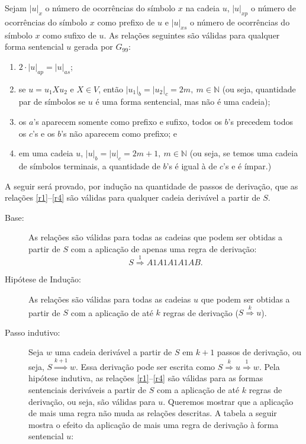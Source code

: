 \documentclass[12pt]{article}
\def\myling{{4}} %
\newcommand{\deriv}[1]{\stackrel{\scriptscriptstyle #1}{\Longrightarrow}}
\begin{document}
\begin{tcolorbox}[breakable,rounded corners, colback=yellow!5, colframe=red!40!black, title={$\mathcal{L}(G_{99})\subseteq \mathcal{L}_{\myling}$, ou seja, se $S \deriv{*} w$, então $w = a^nb^{2m+1}c^{2m+1}a^{2n},\ n,m \geqslant 0$.}]
Sejam $|u|_x$ o número de ocorrências do símbolo $x$ na cadeia $u$, $|u|_{xp}$ o número de ocorrências do símbolo $x$ como prefixo de $u$ e $|u|_{xs}$ o número de ocorrências do símbolo $x$ como sufixo de $u$.
 As relações seguintes são válidas para qualquer forma sentencial $u$ gerada por $G_{99}$:
\begin{enumerate}[label=(\roman*),ref=(\roman*)]
	\item \label{r1} $2\cdot |u|_{ap} = |u|_{as}$;
	\item \label{r2} se $u=u_1Xu_2$ e $X \in V$, então $|u_1|_{b}=|u_2|_{c}=2m,\ m \in \mathbb{N}$ (ou seja, quantidade par de símbolos se $u$ é uma forma sentencial, mas não é uma cadeia);
	\item \label{r3} os $a$'s aparecem somente como prefixo e sufixo, todos os $b$'s precedem todos os $c$'s e os $b$'s não aparecem como prefixo; e
	\item \label{r4} em uma cadeia $u$, $|u|_{b}=|u|_{c}= 2m+1, \ m \in \mathbb{N}$ (ou seja, se temos uma cadeia de símbolos terminais, a quantidade de $b$'s é igual à de $c$'s e é ímpar.)
\end{enumerate}
 A seguir será provado, por indução na quantidade de passos de derivação, que as relações \ref{r1}--\ref{r4} são válidas para qualquer cadeia derivável a partir de $S$.
\begin{description}
	\item[Base:] As relações são válidas para todas as cadeias que podem ser obtidas a partir de $S$ com a aplicação de apenas uma regra de derivação: 
	$$S \deriv{1} A1A1A1A1AB.$$	
	\item[Hipótese de Indução:] As relações são válidas para todas as cadeias $u$ que podem ser obtidas a partir de $S$ com a aplicação de até $k$ regras de derivação ($S \deriv{k}u$).
	\item[Passo indutivo:] Seja $w$ uma cadeia derivável a partir de $S$ em $k+1$ passos de derivação, ou seja, $S \deriv{k+1}w$. Essa derivação pode ser escrita como $S \deriv{k}u \deriv{1}w$. Pela hipótese indutiva, as relações \ref{r1}--\ref{r4} são válidas para as formas sentenciais deriváveis a partir de $S$ com a aplicação de até $k$ regras de derivação, ou seja, são válidas para $u$. Queremos mostrar que a aplicação de mais uma regra não muda as relações descritas. A tabela a seguir mostra o efeito da aplicação de mais uma regra de derivação à forma sentencial $u$:

\end{description}
\end{tcolorbox}
\end{document}
